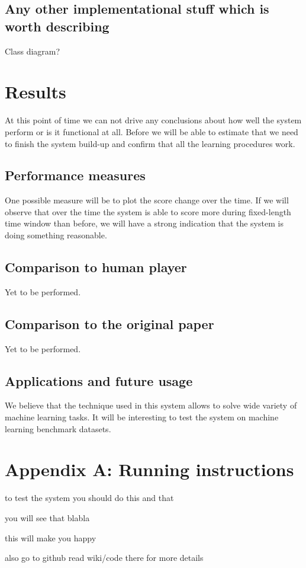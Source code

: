 \documentclass[a4paper,12pt]{article}
\begin{document}
\subsection{Any other implementational stuff which is worth describing}
Class diagram?


%
%
\pagebreak
\section{Results}
At this point of time we can not drive any conclusions about how well the system perform or is it functional at all. Before we will be able to estimate that we need to finish the system build-up and confirm that all the learning procedures work.

\subsection{Performance measures}
One possible measure will be to plot the score change over the time. If we will observe that over the time the system is able to score more during fixed-length time window than before, we will have a strong indication that the system is doing something reasonable.

\subsection{Comparison to human player}
Yet to be performed.

\subsection{Comparison to the original paper}
Yet to be performed.

\subsection{Applications and future usage}
We believe that the technique used in this system allows to solve wide variety of machine learning tasks. It will be interesting to test the system on machine learning benchmark datasets.



%
%
\pagebreak
\section*{Appendix A: Running instructions}
to test the system you should do this and that

you will see that blabla

this will make you happy

also go to github read wiki/code there for more details



%
%
\pagebreak
{}


\end{document}
